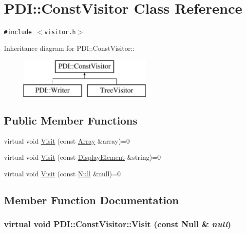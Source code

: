 \hypertarget{class_p_d_i_1_1_const_visitor}{
\section{PDI::ConstVisitor Class Reference}
\label{class_p_d_i_1_1_const_visitor}
}
{\tt \#include $<$visitor.h$>$}

Inheritance diagram for PDI::ConstVisitor::\begin{figure}[H]
\begin{center}
\leavevmode
\includegraphics[height=2cm]{class_p_d_i_1_1_const_visitor}
\end{center}
\end{figure}
\subsection*{Public Member Functions}
\begin{CompactItemize}
\item 
virtual void \hyperlink{class_p_d_i_1_1_const_visitor_7a7cf2134195f958a2d5eeeb6cfc2561}{Visit} (const \hyperlink{class_p_d_i_1_1_array}{Array} \&array)=0
\item 
virtual void \hyperlink{class_p_d_i_1_1_const_visitor_524441ec45975a709fede105f8c30361}{Visit} (const \hyperlink{class_p_d_i_1_1_display_element}{DisplayElement} \&string)=0
\item 
virtual void \hyperlink{class_p_d_i_1_1_const_visitor_bfd97412ff9c3184f22e733eaf3c2dbf}{Visit} (const \hyperlink{class_p_d_i_1_1_null}{Null} \&null)=0
\end{CompactItemize}


\subsection{Member Function Documentation}
\hypertarget{class_p_d_i_1_1_const_visitor_bfd97412ff9c3184f22e733eaf3c2dbf}{
\subsubsection[{Visit}]{\setlength{\rightskip}{0pt plus 5cm}virtual void PDI::ConstVisitor::Visit (const {\bf Null} \& {\em null})}}
\label{class_p_d_i_1_1_const_visitor_bfd97412ff9c3184f22e733eaf3c2dbf}


